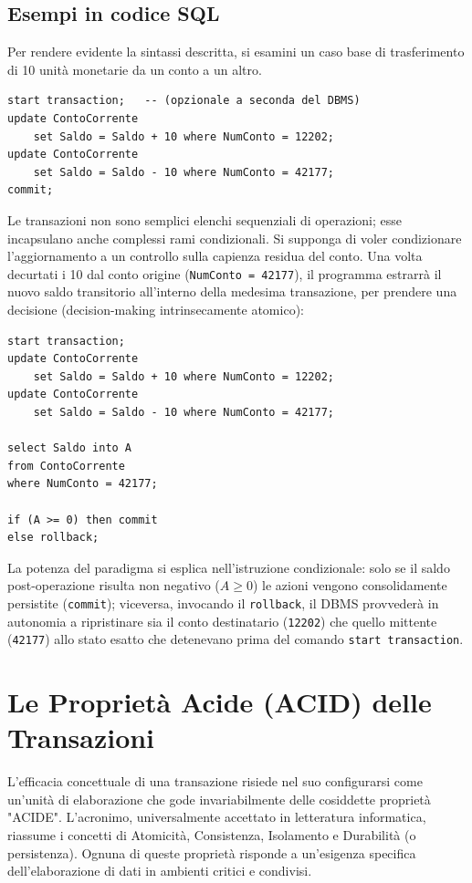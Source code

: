 \subsection{Esempi in codice SQL}
Per rendere evidente la sintassi descritta, si esamini un caso base di trasferimento di 10 unità monetarie da un conto a un altro.

\begin{verbatim}
start transaction;   -- (opzionale a seconda del DBMS)
update ContoCorrente
    set Saldo = Saldo + 10 where NumConto = 12202;
update ContoCorrente
    set Saldo = Saldo - 10 where NumConto = 42177;
commit;
\end{verbatim}

Le transazioni non sono semplici elenchi sequenziali di operazioni; esse incapsulano anche complessi rami condizionali. Si supponga di voler condizionare l'aggiornamento a un controllo sulla capienza residua del conto. Una volta decurtati i 10 dal conto origine (\texttt{NumConto = 42177}), il programma estrarrà il nuovo saldo transitorio all'interno della medesima transazione, per prendere una decisione (decision-making intrinsecamente atomico):

\begin{verbatim}
start transaction;
update ContoCorrente
    set Saldo = Saldo + 10 where NumConto = 12202;
update ContoCorrente
    set Saldo = Saldo - 10 where NumConto = 42177;

select Saldo into A
from ContoCorrente
where NumConto = 42177;

if (A >= 0) then commit
else rollback;
\end{verbatim}

La potenza del paradigma si esplica nell'istruzione condizionale: solo se il saldo post-operazione risulta non negativo ($A \geq 0$) le azioni vengono consolidamente persistite (\texttt{commit}); viceversa, invocando il \texttt{rollback}, il DBMS provvederà in autonomia a ripristinare sia il conto destinatario (\texttt{12202}) che quello mittente (\texttt{42177}) allo stato esatto che detenevano prima del comando \texttt{start transaction}.

\section{Le Proprietà Acide (ACID) delle Transazioni}

L'efficacia concettuale di una transazione risiede nel suo configurarsi come un'unità di elaborazione che gode invariabilmente delle cosiddette proprietà "ACIDE". L'acronimo, universalmente accettato in letteratura informatica, riassume i concetti di Atomicità, Consistenza, Isolamento e Durabilità (o persistenza). Ognuna di queste proprietà risponde a un'esigenza specifica dell'elaborazione di dati in ambienti critici e condivisi.

